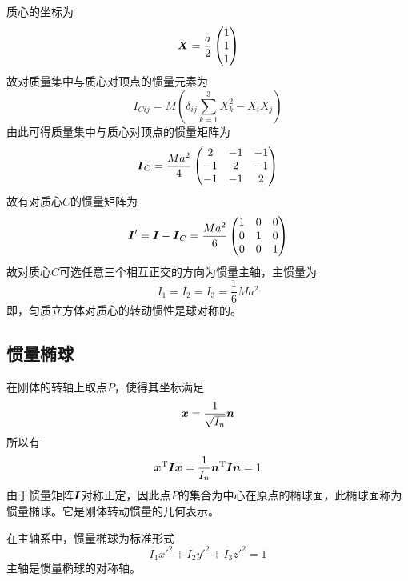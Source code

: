 \begin{solution}
质心的坐标为
\begin{equation*}
	\boldsymbol{X} = \frac{a}{2} \begin{pmatrix} 1 \\ 1 \\ 1 \end{pmatrix}
\end{equation*}
故对质量集中与质心对顶点的惯量元素为
\begin{equation*}
	I_{Cij} = M\left(\delta_{ij} \sum_{k=1}^3 X_k^2 -X_iX_j\right)
\end{equation*}
由此可得质量集中与质心对顶点的惯量矩阵为
\begin{equation*}
	\boldsymbol{I}_C = \frac{Ma^2}{4} \begin{pmatrix} 2 & -1 & -1 \\ -1 & 2 & -1 \\ -1 & -1 & 2 \end{pmatrix}
\end{equation*}
故有对质心$C$的惯量矩阵为
\begin{equation*}
	\boldsymbol{I}' = \boldsymbol{I} - \boldsymbol{I}_C = \frac{Ma^2}{6} \begin{pmatrix} 1 & 0 & 0 \\ 0 & 1 & 0 \\ 0 & 0 & 1 \end{pmatrix}
\end{equation*}
故对质心$C$可选任意三个相互正交的方向为惯量主轴，主惯量为
\begin{equation*}
	I_1 = I_2 = I_3 = \frac16 Ma^2
\end{equation*}
即，匀质立方体对质心的转动惯性是球对称的。
\end{solution}

\subsection{惯量椭球}

在刚体的转轴上取点$P$，使得其坐标满足
\begin{equation*}
	\boldsymbol{x} = \frac{1}{\sqrt{I_n}} \boldsymbol{n}
\end{equation*}
所以有
\begin{equation*}
	\boldsymbol{x}^{\mathrm{T}} \boldsymbol{I} \boldsymbol{x} = \frac{1}{I_n} \boldsymbol{n}^{\mathrm{T}} \boldsymbol{I} \boldsymbol{n} = 1
\end{equation*}
由于惯量矩阵$\boldsymbol{I}$对称正定，因此点$P$的集合为中心在原点的椭球面，此椭球面称为{\heiti 惯量椭球}。它是刚体转动惯量的几何表示。

在主轴系中，惯量椭球为标准形式
\begin{equation*}
	I_1 x'^2 + I_2 y'^2 + I_3 z'^2 = 1
\end{equation*}
主轴是惯量椭球的对称轴。

